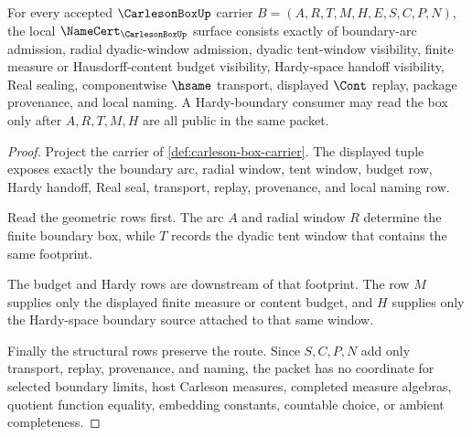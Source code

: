 \begin{theorem}
\label{thm:carleson-box-namecert-obligations}
For every accepted $\CarlesonBoxUp$ carrier $B=(A,R,T,M,H,E,S,C,P,N)$, the local $\NameCert_{\CarlesonBoxUp}$ surface consists exactly of boundary-arc admission, radial dyadic-window admission, dyadic tent-window visibility, finite measure or Hausdorff-content budget visibility, Hardy-space handoff visibility, Real sealing, componentwise $\hsame$ transport, displayed $\Cont$ replay, package provenance, and local naming. A Hardy-boundary consumer may read the box only after $A,R,T,M,H$ are all public in the same packet.
\end{theorem}
\begin{proof}
Project the carrier of \autoref{def:carleson-box-carrier}. The displayed tuple exposes exactly the boundary arc, radial window, tent window, budget row, Hardy handoff, Real seal, transport, replay, provenance, and local naming row.

Read the geometric rows first. The arc $A$ and radial window $R$ determine the finite boundary box, while $T$ records the dyadic tent window that contains the same footprint.

The budget and Hardy rows are downstream of that footprint. The row $M$ supplies only the displayed finite measure or content budget, and $H$ supplies only the Hardy-space boundary source attached to that same window.

Finally the structural rows preserve the route. Since $S,C,P,N$ add only transport, replay, provenance, and naming, the packet has no coordinate for selected boundary limits, host Carleson measures, completed measure algebras, quotient function equality, embedding constants, countable choice, or ambient completeness.
\end{proof}


